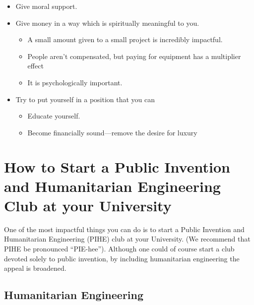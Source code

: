 \documentclass[
	fontsize=10pt, %
	twoside=false, %
	secnumdepth=1, %
]{kaobook}
\begin{document}
\begin{itemize}
\item Give moral support.
\item
  Give money in a way which is spiritually meaningful to you.
  \begin{itemize}
  \item A small amount given to a small project is incredibly impactful.
  \item People aren’t compensated, but paying for equipment has a multiplier effect
  \item It is psychologically important.
  \end{itemize}
\item Try to put yourself in a position that you can
  \begin{itemize}
  \item Educate yourself.
  \item Become financially sound---remove the desire for luxury
  \end{itemize}
\end{itemize}

\section{How to Start a Public Invention and Humanitarian Engineering Club at your University}

\label{sec:piheclub}


One of the most impactful things you can do is to start a Public Invention and Humanitarian Engineering (PIHE) club at your University. (We recommend that PIHE be pronounced “PIE-hee”). Although one could of course start a club devoted
solely to public invention, by including humanitarian engineering the appeal is broadened.



\subsection{Humanitarian Engineering}
\end{document}
